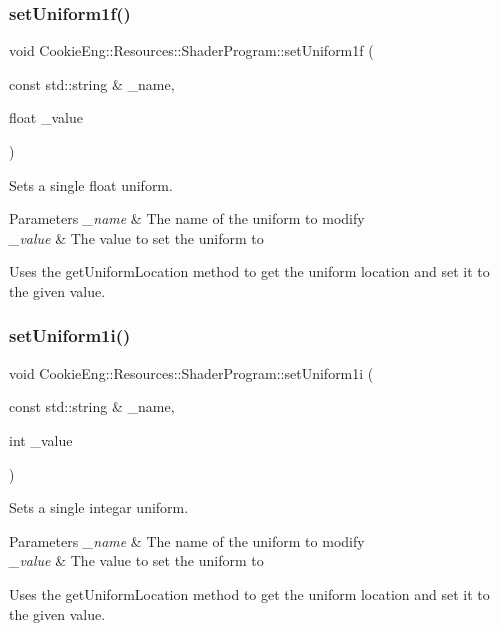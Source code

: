 \subsubsection{\texorpdfstring{set\+Uniform1f()}{setUniform1f()}}
{\footnotesize\ttfamily void Cookie\+Eng\+::\+Resources\+::\+Shader\+Program\+::set\+Uniform1f (\begin{DoxyParamCaption}\item[{const std\+::string \&}]{\+\_\+name,  }\item[{float}]{\+\_\+value }\end{DoxyParamCaption})}



Sets a single float uniform. 


\begin{DoxyParams}{Parameters}
{\em \+\_\+name} & The name of the uniform to modify \\
\hline
{\em \+\_\+value} & The value to set the uniform to\\
\hline
\end{DoxyParams}
Uses the get\+Uniform\+Location method to get the uniform location and set it to the given value. \mbox{\label{class_cookie_eng_1_1_resources_1_1_shader_program_a328b09fef2d715e25f9dc3993b060b99}} 
\subsubsection{\texorpdfstring{set\+Uniform1i()}{setUniform1i()}}
{\footnotesize\ttfamily void Cookie\+Eng\+::\+Resources\+::\+Shader\+Program\+::set\+Uniform1i (\begin{DoxyParamCaption}\item[{const std\+::string \&}]{\+\_\+name,  }\item[{int}]{\+\_\+value }\end{DoxyParamCaption})}



Sets a single integar uniform. 


\begin{DoxyParams}{Parameters}
{\em \+\_\+name} & The name of the uniform to modify \\
\hline
{\em \+\_\+value} & The value to set the uniform to\\
\hline
\end{DoxyParams}
Uses the get\+Uniform\+Location method to get the uniform location and set it to the given value. \mbox{\label{class_cookie_eng_1_1_resources_1_1_shader_program_ad13eabf4105d4d484d72c16696143254}} 
